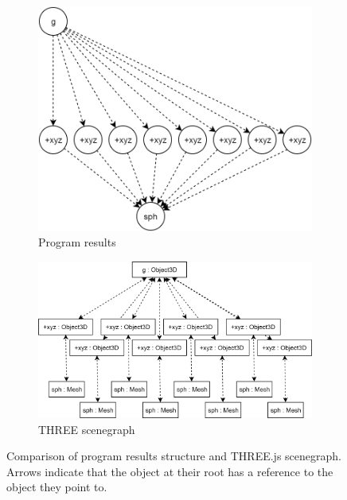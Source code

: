\begin{figure}
  \centering
  \begin{subfigure}[b]{0.49\textwidth}
    \includegraphics[width=1.0\textwidth]{./images/display_results/results}
    \caption{Program results}
    \label{sub:fig:prog:res}
  \end{subfigure}
  \begin{subfigure}[b]{0.49\textwidth}
    \includegraphics[width=1.0\textwidth]{./images/display_results/three}
    \caption{THREE scenegraph}
    \label{sub:fig:three:res}
  \end{subfigure}
  \caption[Comparison of program results structure and THREE.js scenegraph.]{Comparison of program results structure and THREE.js scenegraph. Arrows indicate that the object at their root has a reference to the object they point to.}
  \label{fig:results:vs:three}
\end{figure}


